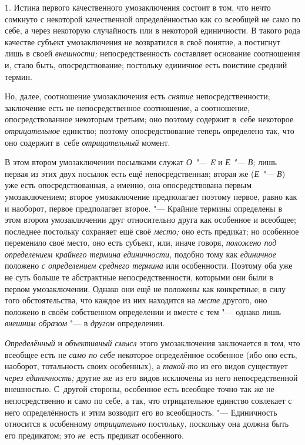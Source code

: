 1. Истина первого качественного умозаключения состоит в том,
что нечто сомкнуто с некоторой качественной определённостью как со всеобщей
не само по себе, а через некоторую случайность или в некоторой единичности.
В такого рода качестве субъект умозаключения не возвратился в своё понятие,
а постигнут лишь в своей {\em внешности;}
непосредственность составляет основание соотношения и, стало
быть, опосредствование; постольку единичное есть поистине средний термин.

Но, далее, соотношение умозаключения есть {\em снятие}
непосредственности; заключение есть не непосредственное
соотношение, а соотношение, опосредствованное некоторым третьим; оно
поэтому содержит в~себе некоторое {\em отрицательное}
единство; поэтому опосредствование теперь определено так, что
оно содержит в~себе {\em отрицательный} момент.

В этом втором умозаключении посылками служат {\em О "--- E} и {\em Е "--- В;}
лишь первая из этих двух посылок есть ещё непосредственная; вторая же
({\em Е "--- В}) уже есть опосредствованная, а именно, она опосредствована
первым умозаключением; второе умозаключение предполагает поэтому первое,
равно как и наоборот, первое предполагает второе. "--- Крайние
термины определены в этом втором умозаключении друг относительно друга как
особенное и всеобщее; последнее постольку сохраняет ещё своё {\em место;}
оно есть предикат; но особенное переменило своё место, оно есть субъект,
или, иначе говоря, {\em положено под определением
крайнего термина единичности,} подобно тому как
{\em единичное} положено {\em с определением среднего термина}
или особенности. Поэтому оба уже не суть больше те
абстрактные непосредственности, которыми они были в первом умозаключении.
Однако они ещё не положены как конкретные; в силу того обстоятельства, что
каждое из них находится на {\em месте} другого, оно положено в своём
собственном определении и вместе с тем "--- однако лишь
{\em внешним образом} "--- в {\em другом} определении.

{\em Определённый} и {\em объективный смысл}
этого умозаключения заключается в том, что всеобщее есть не
{\em само по себе} некоторое определённое особенное (ибо оно есть, наоборот,
тотальность своих особенных), а {\em такой-то} из его видов существует
{\em через единичность;} другие же из его видов исключены из него
непосредственной внешностью. С~другой стороны, особенное есть всеобщее
точно так же не непосредственно и само по себе, а так, что отрицательное
единство совлекает с него определённость и этим возводит его во
всеобщность. "--- Единичность относится к особенному {\em отрицательно}
постольку, поскольку она должна быть его предикатом; это
{\em не}~есть предикат особенного.

